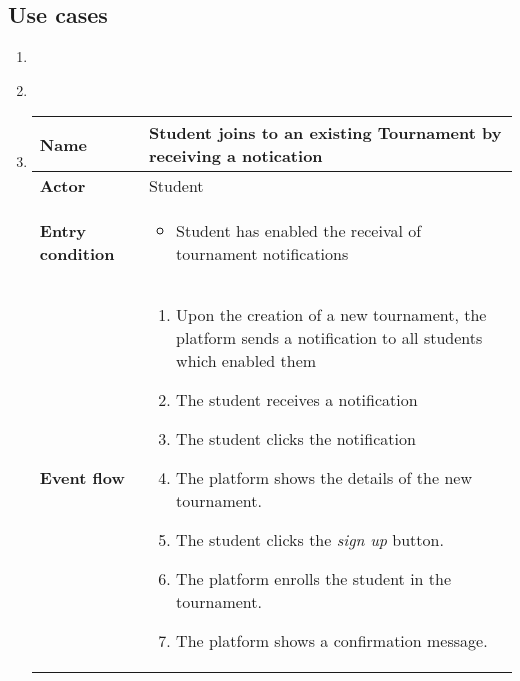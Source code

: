 \subsection{Use cases}
\begin{enumerate}[label=\textbf{UC\arabic*}:,leftmargin=1.3cm]
    \item
    \item \textbf{}
          \pagebreak
    \item \textbf{}
          \begin{table}[H]
              \centering
              \begin{tabular}{|l|p{11.9cm}|}
                  \hline
                  \textbf{Name}            & Student joins to an existing Tournament by receiving a notication                     \\\hline
                  \textbf{Actor}           & Student                                                                               \\\hline
                  \textbf{Entry condition} &
                  \begin{itemize}
                      \item Student has enabled the receival of tournament notifications
                  \end{itemize}                                                \\\hline
                  \textbf{Event flow}      &
                  \begin{enumerate}[label=\arabic*.]
                      \item Upon the creation of a new tournament, the platform sends a notification to all students which enabled them
                      \item The student receives a notification
                      \item The student clicks the notification
                      \item The platform shows the details of the new tournament.
                      \item The student clicks the \emph{sign up} button.
                      \item The platform enrolls the student in the tournament.
                      \item The platform shows a confirmation message.

\end{enumerate}
\end{tabular}
\end{table}
\end{enumerate}
